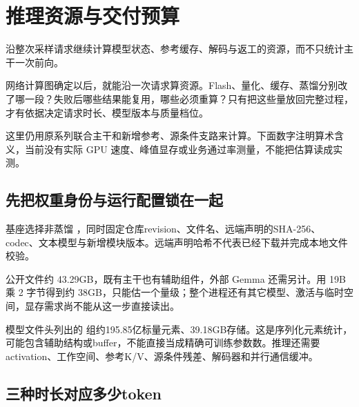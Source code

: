 \chapter{推理资源与交付预算}\label{seedance-m26}

沿整次采样请求继续计算模型状态、参考缓存、解码与返工的资源，而不只统计主干一次前向。

网络计算图确定以后，就能沿一次请求算资源。Flash、量化、缓存、蒸馏分别改了哪一段？失败后哪些结果能复用，哪些必须重算？只有把这些量放回完整过程，才有依据决定请求时长、模型版本与质量档位。

这里仍用原系列联合主干和新增参考、源条件支路来计算。下面数字注明算术含义，当前没有实际 GPU 速度、峰值显存或业务通过率测量，不能把估算读成实测。

\section{先把权重身份与运行配置锁在一起}\label{seedance-m26-ux5148ux628aux6743ux91cdux8eabux4efdux4e0eux8fd0ux884cux914dux7f6eux9501ux5728ux4e00ux8d77}

基座选择非蒸馏 ，同时固定仓库revision、文件名、远端声明的SHA-256、codec、文本模型与新增模块版本。远端声明哈希不代表已经下载并完成本地文件校验。

公开文件约 43.29GB，既有主干也有辅助组件，外部 Gemma 还需另计。用 19B 乘 2 字节得到约 38GB，只能估一个量级；整个进程还有其它模型、激活与临时空间，显存需求尚不能从这一步直接读出。

模型文件头列出的  组约195.85亿标量元素、39.18GB存储。这是序列化元素统计，可能包含辅助结构或buffer，不能直接当成精确可训练参数数。推理还需要activation、工作空间、参考K/V、源条件残差、解码器和并行通信缓冲。

\section{三种时长对应多少token}\label{seedance-m26-ux4e09ux79cdux65f6ux957fux5bf9ux5e94ux591aux5c11token}

